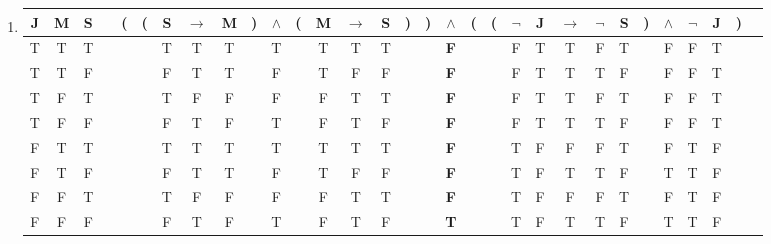 \begin{enumerate}
\item
\begin{tabular}{@{ }c@{ }@{ }c@{ }@{ }c | c@{ }@{}c@{}@{}c@{}@{ }c@{ }@{ }c@{ }@{ }c@{ }@{}c@{}@{ }c@{ }@{}c@{}@{ }c@{ }@{ }c@{ }@{ }c@{ }@{}c@{}@{}c@{}@{ }c@{ }@{}c@{}@{}c@{}@{ }c@{ }@{ }c@{ }@{ }c@{ }@{ }c@{ }@{ }c@{ }@{}c@{}@{ }c@{ }@{ }c@{ }@{ }c@{ }@{}c@{}@{ }c}
J & M & S &  & ( & ( & S & $\rightarrow$ & M & ) & $\land$ & ( & M & $\rightarrow$ & S & ) & ) & $\land$ & ( & ( & $\lnot$ & J & $\rightarrow$ & $\lnot$ & S & ) & $\land$ & $\lnot$ & J & ) & \\
\hline
T & T & T &  &  &  & T & T & T &  & T &  & T & T & T &  &  & \textbf{F} &  &  & F & T & T & F & T &  & F & F & T &  & \\
T & T & F &  &  &  & F & T & T &  & F &  & T & F & F &  &  & \textbf{F} &  &  & F & T & T & T & F &  & F & F & T &  & \\
T & F & T &  &  &  & T & F & F &  & F &  & F & T & T &  &  & \textbf{F} &  &  & F & T & T & F & T &  & F & F & T &  & \\
T & F & F &  &  &  & F & T & F &  & T &  & F & T & F &  &  & \textbf{F} &  &  & F & T & T & T & F &  & F & F & T &  & \\
F & T & T &  &  &  & T & T & T &  & T &  & T & T & T &  &  & \textbf{F} &  &  & T & F & F & F & T &  & F & T & F &  & \\
F & T & F &  &  &  & F & T & T &  & F &  & T & F & F &  &  & \textbf{F} &  &  & T & F & T & T & F &  & T & T & F &  & \\
F & F & T &  &  &  & T & F & F &  & F &  & F & T & T &  &  & \textbf{F} &  &  & T & F & F & F & T &  & F & T & F &  & \\
F & F & F &  &  &  & F & T & F &  & T &  & F & T & F &  &  & \textbf{T} &  &  & T & F & T & T & F &  & T & T & F &  & \\
\end{tabular}


\end{enumerate}
